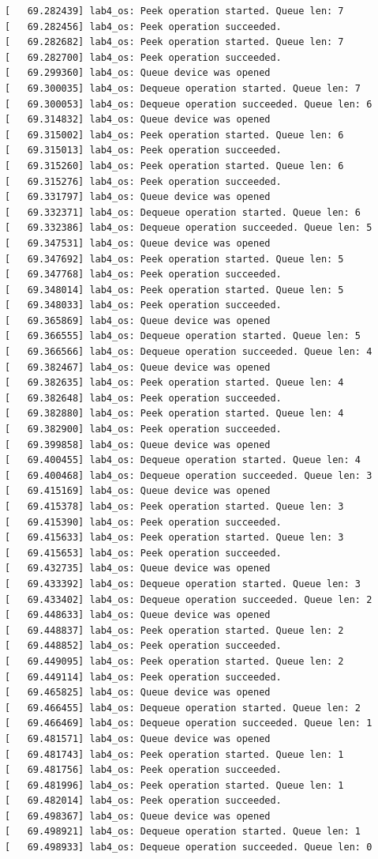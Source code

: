 \documentclass[a4paper,14pt]{extarticle}
\begin{document}
\begin{verbatim}
[   69.282439] lab4_os: Peek operation started. Queue len: 7
[   69.282456] lab4_os: Peek operation succeeded.
[   69.282682] lab4_os: Peek operation started. Queue len: 7
[   69.282700] lab4_os: Peek operation succeeded.
[   69.299360] lab4_os: Queue device was opened
[   69.300035] lab4_os: Dequeue operation started. Queue len: 7
[   69.300053] lab4_os: Dequeue operation succeeded. Queue len: 6
[   69.314832] lab4_os: Queue device was opened
[   69.315002] lab4_os: Peek operation started. Queue len: 6
[   69.315013] lab4_os: Peek operation succeeded.
[   69.315260] lab4_os: Peek operation started. Queue len: 6
[   69.315276] lab4_os: Peek operation succeeded.
[   69.331797] lab4_os: Queue device was opened
[   69.332371] lab4_os: Dequeue operation started. Queue len: 6
[   69.332386] lab4_os: Dequeue operation succeeded. Queue len: 5
[   69.347531] lab4_os: Queue device was opened
[   69.347692] lab4_os: Peek operation started. Queue len: 5
[   69.347768] lab4_os: Peek operation succeeded.
[   69.348014] lab4_os: Peek operation started. Queue len: 5
[   69.348033] lab4_os: Peek operation succeeded.
[   69.365869] lab4_os: Queue device was opened
[   69.366555] lab4_os: Dequeue operation started. Queue len: 5
[   69.366566] lab4_os: Dequeue operation succeeded. Queue len: 4
[   69.382467] lab4_os: Queue device was opened
[   69.382635] lab4_os: Peek operation started. Queue len: 4
[   69.382648] lab4_os: Peek operation succeeded.
[   69.382880] lab4_os: Peek operation started. Queue len: 4
[   69.382900] lab4_os: Peek operation succeeded.
[   69.399858] lab4_os: Queue device was opened
[   69.400455] lab4_os: Dequeue operation started. Queue len: 4
[   69.400468] lab4_os: Dequeue operation succeeded. Queue len: 3
[   69.415169] lab4_os: Queue device was opened
[   69.415378] lab4_os: Peek operation started. Queue len: 3
[   69.415390] lab4_os: Peek operation succeeded.
[   69.415633] lab4_os: Peek operation started. Queue len: 3
[   69.415653] lab4_os: Peek operation succeeded.
[   69.432735] lab4_os: Queue device was opened
[   69.433392] lab4_os: Dequeue operation started. Queue len: 3
[   69.433402] lab4_os: Dequeue operation succeeded. Queue len: 2
[   69.448633] lab4_os: Queue device was opened
[   69.448837] lab4_os: Peek operation started. Queue len: 2
[   69.448852] lab4_os: Peek operation succeeded.
[   69.449095] lab4_os: Peek operation started. Queue len: 2
[   69.449114] lab4_os: Peek operation succeeded.
[   69.465825] lab4_os: Queue device was opened
[   69.466455] lab4_os: Dequeue operation started. Queue len: 2
[   69.466469] lab4_os: Dequeue operation succeeded. Queue len: 1
[   69.481571] lab4_os: Queue device was opened
[   69.481743] lab4_os: Peek operation started. Queue len: 1
[   69.481756] lab4_os: Peek operation succeeded.
[   69.481996] lab4_os: Peek operation started. Queue len: 1
[   69.482014] lab4_os: Peek operation succeeded.
[   69.498367] lab4_os: Queue device was opened
[   69.498921] lab4_os: Dequeue operation started. Queue len: 1
[   69.498933] lab4_os: Dequeue operation succeeded. Queue len: 0
\end{verbatim}
\end{document}
